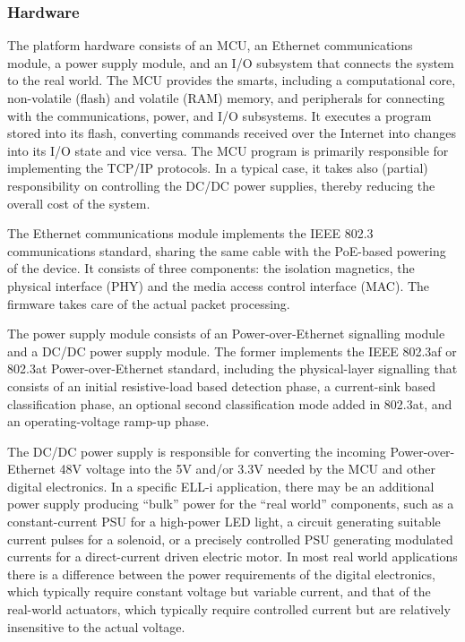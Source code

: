 \documentclass[final]{siamltex}
\begin{document}
\subsubsection{Hardware}

The platform hardware consists of an MCU, an Ethernet
communications module, a power supply module, and an I/O subsystem
that connects the system to the real world.  The MCU provides the
smarts, including a computational core, non-volatile (flash) and
volatile (RAM) memory, and peripherals for connecting with the
communications, power, and I/O subsystems.  It executes a program
stored into its flash, converting commands received over the Internet
into changes into its I/O state and vice versa.  The MCU program is
primarily responsible for implementing the TCP/IP protocols.  In a
typical case, it takes also (partial) responsibility on controlling
the DC/DC power supplies, thereby reducing the overall cost of the
system.

The Ethernet communications module implements the IEEE 802.3~\cite{802.3}
communications standard, sharing the same cable with the PoE-based
powering of the device.  It consists of three components: the
isolation magnetics, the physical interface (PHY) and the media access
control interface (MAC).  The firmware takes care of the actual packet
processing.

The power supply module consists of an Power-over-Ethernet signalling
module and a DC/DC power supply module.  The former implements the
IEEE 802.3af or 802.3at
Power-over-Ethernet standard, including the physical-layer signalling
that consists of an initial resistive-load based detection phase, a
current-sink based classification phase, an optional second
classification mode added in 802.3at, and an operating-voltage ramp-up
phase.  

The DC/DC power supply is responsible for converting the incoming
Power-over-Ethernet 48V voltage into the 5V and/or 3.3V needed by the
MCU and other digital electronics.  In a specific ELL-i application,
there may be an additional power supply producing ``bulk'' power for
the ``real world'' components, such as a constant-current PSU for a
high-power LED light, a circuit generating suitable current pulses for
a solenoid, or a precisely controlled PSU generating modulated
currents for a direct-current driven electric motor.  In most real
world applications there is a difference between the power
requirements of the digital electronics, which typically require
constant voltage but variable current, and that of the real-world
actuators, which typically require controlled current but are
relatively insensitive to the actual voltage.
\end{document}
